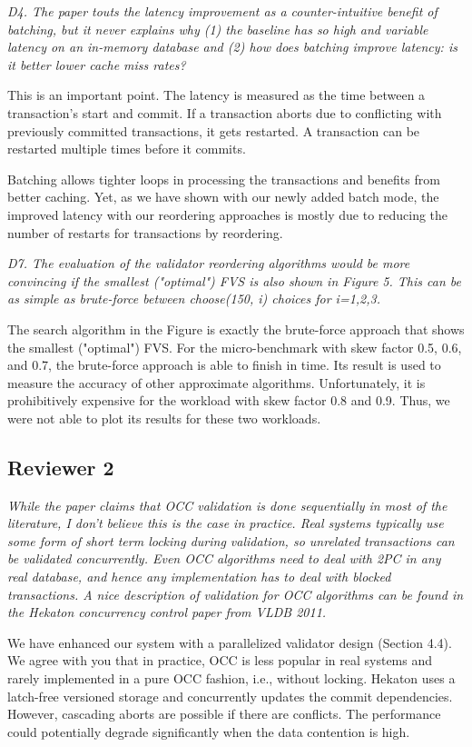\documentclass{article}
\begin{document}
\emph{D4. The paper touts the latency improvement as a counter-intuitive benefit of batching, but it never explains why (1) the baseline has so high and variable latency on an in-memory database and (2) how does batching improve latency: is it better lower cache miss rates?}

This is an important point. The latency is measured as the time between a transaction's start and commit. If a transaction aborts due to conflicting with previously committed transactions, it gets restarted. A transaction can be restarted multiple times before it commits. 

Batching allows tighter loops in processing the transactions and benefits from better caching. Yet, as we have shown with our newly added batch mode, the improved latency with our reordering approaches is mostly due to reducing the number of restarts for transactions by reordering.

\emph{D7. The evaluation of the validator reordering algorithms would be more convincing if the smallest ("optimal") FVS is also shown in Figure 5. This can be as simple as brute-force between choose(150, i) choices for i=1,2,3.}

The search algorithm in the Figure is exactly the brute-force approach that shows the smallest ("optimal") FVS. For the micro-benchmark with skew factor 0.5, 0.6, and 0.7, the brute-force approach is able to finish in time. Its result is used to measure the accuracy of other approximate algorithms. Unfortunately, it is prohibitively expensive for the workload with skew factor 0.8 and 0.9. Thus, we were not able to plot its results for these two workloads.

\subsection{Reviewer 2}


\emph{While the paper claims that OCC validation is done sequentially in most of the literature, I don't believe this is the case in practice. Real systems typically use some form of short term locking during validation, so unrelated transactions can be validated concurrently. Even OCC algorithms need to deal with 2PC in any real database, and hence any implementation has to deal with blocked transactions. A nice description of validation for OCC algorithms can be found in the Hekaton concurrency control paper from VLDB 2011. }

We have enhanced our system with a parallelized validator design (Section 4.4). We agree with you that in practice, OCC is less popular in real systems and rarely implemented in a pure OCC fashion, i.e., without locking. Hekaton uses a latch-free versioned storage and concurrently updates the commit dependencies. However, cascading aborts are possible if there are conflicts. The performance could potentially degrade significantly when the data contention is high.
\end{document}
